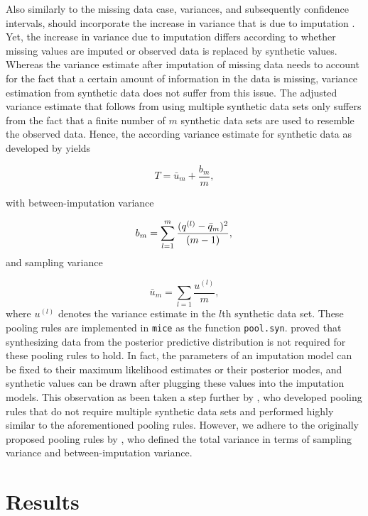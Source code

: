 \documentclass[psych,article,submit,moreauthors,pdftex]{mdpi}
\begin{document}
Also similarly to the missing data case, variances, and subsequently
confidence intervals, should incorporate the increase in variance that
is due to imputation
\citep{reiter_partially_inference_2003, drechsler_synthetic_2011}. Yet,
the increase in variance due to imputation differs according to whether
missing values are imputed or observed data is replaced by synthetic
values. Whereas the variance estimate after imputation of missing data
needs to account for the fact that a certain amount of information in
the data is missing, variance estimation from synthetic data does not
suffer from this issue. The adjusted variance estimate that follows from
using multiple synthetic data sets only suffers from the fact that a
finite number of \(m\) synthetic data sets are used to resemble the
observed data. Hence, the according variance estimate for synthetic data
as developed by \citet{reiter_partially_inference_2003} yields

\[
T = \bar{u}_m + \frac{b_m}{m},
\]

with between-imputation variance

\[
b_m = \sum_{l = 1}^m \frac{(q^{(l)} - \bar{q}_m)^2}{(m - 1)}, \\
\] and sampling variance

\[
\bar{u}_m = \sum_{l = 1} \frac{u^{(l)}}{m},
\] where \(u^{(l)}\) denotes the variance estimate in the \(l\)th
synthetic data set. These pooling rules are implemented in \texttt{mice}
as the function \texttt{pool.syn}. \citet{reiter_kinney_2012} proved
that synthesizing data from the posterior predictive distribution is not
required for these pooling rules to hold. In fact, the parameters of an
imputation model can be fixed to their maximum likelihood estimates or
their posterior modes, and synthetic values can be drawn after plugging
these values into the imputation models. This observation as been taken
a step further by \citet{raab_practical_2016}, who developed pooling
rules that do not require multiple synthetic data sets and performed
highly similar to the aforementioned pooling rules. However, we adhere
to the originally proposed pooling rules by
\citet{reiter_partially_inference_2003}, who defined the total variance
in terms of sampling variance and between-imputation variance.

\hypertarget{results}{%
\section{Results}\label{results}}
\end{document}
